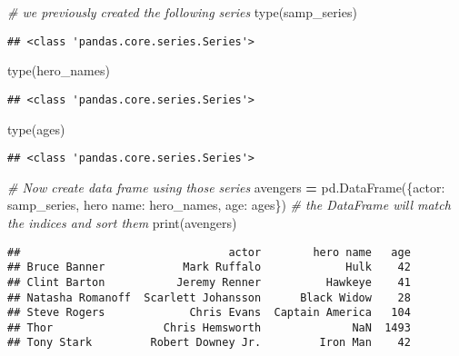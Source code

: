 \documentclass[
]{book}
\newenvironment{Shaded}{\begin{snugshade}}{\end{snugshade}}
\newcommand{\BuiltInTok}[1]{#1}
\newcommand{\CommentTok}[1]{\textcolor[rgb]{0.56,0.35,0.01}{\textit{#1}}}
\newcommand{\NormalTok}[1]{#1}
\newcommand{\OperatorTok}[1]{\textcolor[rgb]{0.81,0.36,0.00}{\textbf{#1}}}
\newcommand{\StringTok}[1]{\textcolor[rgb]{0.31,0.60,0.02}{#1}}
\begin{document}
\begin{Shaded}
\begin{Highlighting}[]
\CommentTok{\# we previously created the following series}
\BuiltInTok{type}\NormalTok{(samp\_series)}
\end{Highlighting}
\end{Shaded}

\begin{verbatim}
## <class 'pandas.core.series.Series'>
\end{verbatim}

\begin{Shaded}
\begin{Highlighting}[]
\BuiltInTok{type}\NormalTok{(hero\_names)}
\end{Highlighting}
\end{Shaded}

\begin{verbatim}
## <class 'pandas.core.series.Series'>
\end{verbatim}

\begin{Shaded}
\begin{Highlighting}[]
\BuiltInTok{type}\NormalTok{(ages)}
\end{Highlighting}
\end{Shaded}

\begin{verbatim}
## <class 'pandas.core.series.Series'>
\end{verbatim}

\begin{Shaded}
\begin{Highlighting}[]
\CommentTok{\# Now create data frame using those series}
\NormalTok{avengers }\OperatorTok{=}\NormalTok{ pd.DataFrame(\{}\StringTok{\textquotesingle{}actor\textquotesingle{}}\NormalTok{: samp\_series, }\StringTok{\textquotesingle{}hero name\textquotesingle{}}\NormalTok{: hero\_names, }\StringTok{\textquotesingle{}age\textquotesingle{}}\NormalTok{: ages\})}
\CommentTok{\# the DataFrame will match the indices and sort them}
\BuiltInTok{print}\NormalTok{(avengers)}
\end{Highlighting}
\end{Shaded}

\begin{verbatim}
##                                actor        hero name   age
## Bruce Banner            Mark Ruffalo             Hulk    42
## Clint Barton           Jeremy Renner          Hawkeye    41
## Natasha Romanoff  Scarlett Johansson      Black Widow    28
## Steve Rogers             Chris Evans  Captain America   104
## Thor                 Chris Hemsworth              NaN  1493
## Tony Stark         Robert Downey Jr.         Iron Man    42
\end{verbatim}
\end{document}
